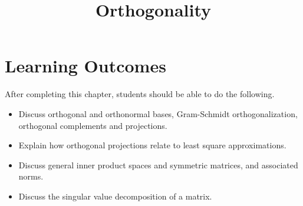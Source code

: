 \documentclass{ximera}
\title{Orthogonality}
\begin{document}
\begin{abstract}

\end{abstract}
 
\maketitle
 
\section*{Learning Outcomes}
After completing this chapter, students should be able to do the following.
 
\begin{itemize}
    \item Discuss orthogonal and orthonormal bases, Gram-Schmidt orthogonalization, orthogonal complements and projections. 
    \item Explain how orthogonal projections relate to least square approximations.
    \item Discuss general inner product spaces and symmetric matrices, and associated norms.
    \item Discuss the singular value decomposition of a matrix.
\end{itemize}




 
\end{document}
